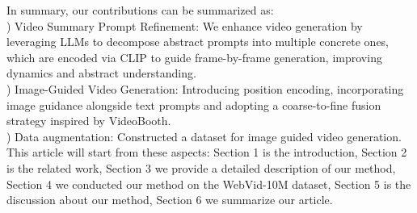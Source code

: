 \indent In summary, our contributions can be summarized as:\\
) Video Summary Prompt Refinement: We enhance video generation by leveraging LLMs to decompose abstract prompts into multiple concrete ones, which are encoded via CLIP to guide frame-by-frame generation, improving dynamics and abstract understanding.\\
) Image-Guided Video Generation: Introducing position encoding, incorporating image guidance alongside text prompts and adopting a coarse-to-fine fusion strategy inspired by VideoBooth.\\
) Data augmentation: Constructed a dataset for image guided video generation.\\
\indent This article will start from these aspects: Section 1 is the introduction, Section 2 is the related work, Section 3 we provide a detailed description of our method, Section 4 we conducted our method on the WebVid-10M dataset, Section 5 is the discussion about our method, Section 6 we summarize our article.